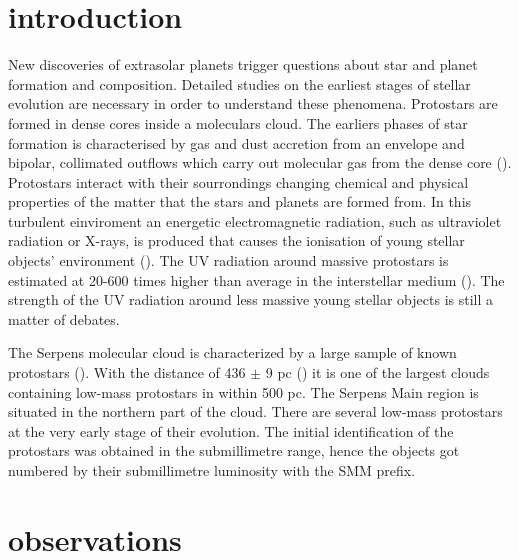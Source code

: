 \documentclass[a4paper]{article}
\begin{document}
\section*{\sc introduction}
\indent \indent New discoveries of extrasolar planets trigger questions about star and planet formation and composition. Detailed studies on the earliest stages of stellar evolution are necessary in order to understand these phenomena. Protostars are formed in dense cores inside a moleculars cloud. The earliers phases of star formation is characterised by gas and dust accretion from an envelope and bipolar, collimated outflows which carry out molecular gas from the dense core (\cite{arce2006}). Protostars interact with their sourrondings changing chemical and physical properties of the matter that the stars and planets are formed from. In this turbulent einviroment an energetic electromagnetic radiation, such as ultraviolet radiation or X-rays, is produced that causes the ionisation of young stellar objects' environment (\cite{stauber2007}). The UV radiation around massive protostars is estimated at 20-600 times higher than average in the interstellar medium (\cite{benz2016}). The strength of the UV radiation around less massive young stellar objects is still a matter of debates. 

\indent \indent The Serpens molecular cloud is characterized by a large sample of known protostars (\cite{evans2009}). With the distance of 436 $\pm$ 9 pc (\cite{ortiz2017}) it is one of the largest clouds containing low-mass protostars in within 500 pc. The Serpens Main region is situated in the northern part of the cloud. There are several low-mass protostars at the very early stage of their evolution. The initial identification of the protostars was obtained in the submillimetre range, hence the objects got numbered by their submillimetre luminosity with the SMM prefix. 

\section*{\sc observations}
\end{document}
